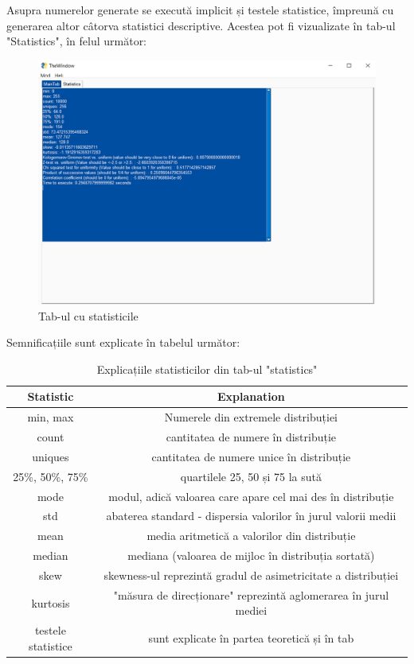 Asupra numerelor generate se execută implicit și testele statistice, împreună cu generarea altor câtorva statistici descriptive. Acestea pot fi vizualizate în tab-ul "Statistics", în felul următor:
\begin{figure}[H]
    \centering
    \includegraphics[width=1.0\textwidth]{continut/capitol3/figuri/Statistici.png}
    \caption{Tab-ul cu statisticile}
    \label{fig:StatisticsWindow}
\end{figure}

Semnificațiile sunt explicate în tabelul următor:
\begin{table}[H]
    \centering
    \begin{tabular}{|c|c|}
        \hline
        Statistic & Explanation \\
        \hline  
         min, max & Numerele din extremele distribuției  \\
         count & cantitatea de numere în distribuție  \\
         uniques & cantitatea de numere unice în distribuție \\
         25\%, 50\%, 75\% & quartilele 25, 50 și 75 la sută \\
         mode & modul, adică valoarea care apare cel mai des în distribuție \\
         std & abaterea standard - dispersia valorilor în jurul valorii medii \\
         mean & media aritmetică a valorilor din distribuție \\
         median & mediana (valoarea de mijloc în distribuția sortată) \\
         skew & skewness-ul reprezintă gradul de asimetricitate a distribuției \\
         kurtosis & "măsura de direcționare" reprezintă aglomerarea în jurul mediei \\
         testele statistice & sunt explicate în partea teoretică și în tab\\
        \hline
    \end{tabular}
    \caption{Explicațiile statisticilor din tab-ul "statistics"}
    \label{tab:StatisticsExplainTable}
\end{table}